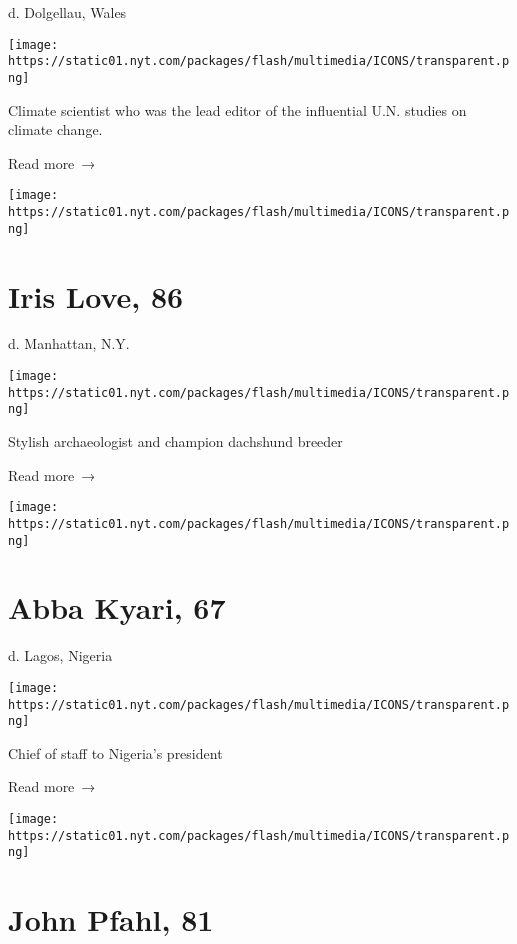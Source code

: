 d. Dolgellau, Wales

\texttt{[image: https://static01.nyt.com/packages/flash/multimedia/ICONS/transparent.png]}

Climate scientist who was the lead editor of the influential U.N.
studies on climate change.

 Read more~→

\href{https://www.nytimes.com/2020/04/23/nyregion/iris-love-dead.html}{}

\texttt{[image: https://static01.nyt.com/packages/flash/multimedia/ICONS/transparent.png]}

\hypertarget{iris-love-86}{%
\section{Iris Love, 86}\label{iris-love-86}}

d. Manhattan, N.Y.

\texttt{[image: https://static01.nyt.com/packages/flash/multimedia/ICONS/transparent.png]}

Stylish archaeologist and champion dachshund breeder

 Read more~→

\href{https://www.nytimes.com/2020/04/23/obituaries/abba-kyari-dead-coronavirus.html}{}

\texttt{[image: https://static01.nyt.com/packages/flash/multimedia/ICONS/transparent.png]}

\hypertarget{abba-kyari-67}{%
\section{Abba Kyari, 67}\label{abba-kyari-67}}

d. Lagos, Nigeria

\texttt{[image: https://static01.nyt.com/packages/flash/multimedia/ICONS/transparent.png]}

Chief of staff to Nigeria's president

 Read more~→

\href{https://www.nytimes.com/2020/04/23/arts/john-pfahl-photographer-who-played-with-landscapes-dies-at-81.html}{}

\texttt{[image: https://static01.nyt.com/packages/flash/multimedia/ICONS/transparent.png]}

\hypertarget{john-pfahl-81}{%
\section{John Pfahl, 81}\label{john-pfahl-81}}

